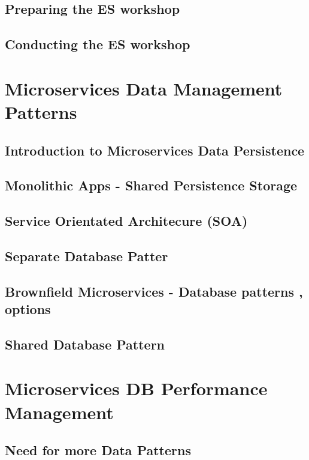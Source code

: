 \documentclass[a4paper, 11pt]{book}
\begin{document}
    \section{Preparing the ES workshop}


    \section{Conducting the ES workshop}


    \chapter{Microservices Data Management Patterns}


    \section{Introduction to Microservices Data Persistence}


    \section{Monolithic Apps - Shared Persistence Storage}


    \section{Service Orientated Architecure (SOA)}


    \section{Separate Database Patter}


    \section{Brownfield Microservices - Database patterns , options}


    \section{Shared Database Pattern}


    \chapter{Microservices DB Performance Management}


    \section{Need for more Data Patterns}
\end{document}
